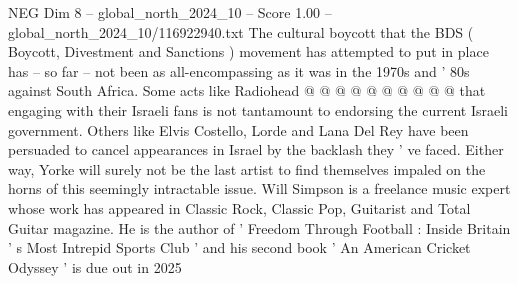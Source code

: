 \begin{textsample}{NEG Dim 8 – global\_north\_2024\_10 – Score 1.00 – global\_north\_2024\_10/116922940.txt}
The cultural boycott that the BDS ( Boycott, Divestment and Sanctions ) movement has attempted to put in place has -- so far -- not been as all-encompassing as it was in the 1970s and ' 80s against South Africa.
Some acts like Radiohead @ @ @ @ @ @ @ @ @ @ that engaging with their Israeli fans is not tantamount to endorsing the current Israeli government.
Others like Elvis Costello, Lorde and Lana Del Rey have been persuaded to cancel appearances in Israel by the backlash they ' ve faced.
Either way, Yorke will surely not be the last artist to find themselves impaled on the horns of this seemingly intractable issue.
Will Simpson is a freelance music expert whose work has appeared in Classic Rock, Classic Pop, Guitarist and Total Guitar magazine.
He is the author of ' Freedom Through Football : Inside Britain ' s Most Intrepid Sports Club ' and his second book ' An American Cricket Odyssey ' is due out in 2025

\end{textsample}
